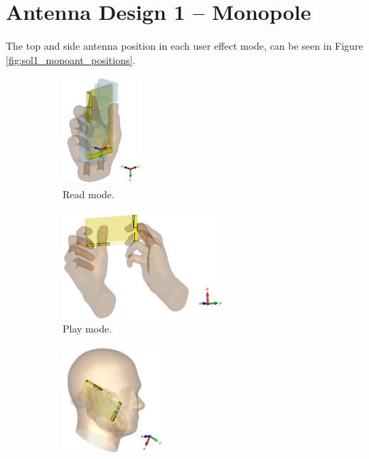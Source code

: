 \section{Antenna Design 1 -- Monopole}
The top and side antenna position in each user effect mode, can be seen in Figure \ref{fig:sol1_monoant_positions}.

\begin{figure}[htbp]
    \centering
    \begin{subfigure}[b]{0.24\linewidth}
        \centering \includegraphics[width=\linewidth,height=4cm,keepaspectratio]{img/tech_sol/monopole/read_mode/3d_read_mode.PNG}
        \caption{Read mode.}
    \end{subfigure}
    \begin{subfigure}[b]{0.24\linewidth}
        \centering \includegraphics[width=\linewidth,height=4cm,keepaspectratio]{img/tech_sol/monopole/play_mode/3d_play_mode.PNG}
        \caption{Play mode.}
    \end{subfigure}
    \begin{subfigure}[b]{0.24\linewidth}
        \centering \includegraphics[width=\linewidth,height=4cm,keepaspectratio]{img/tech_sol/monopole/talk_mode/3d_talk_mode.PNG}

\end{subfigure}
\end{figure}
